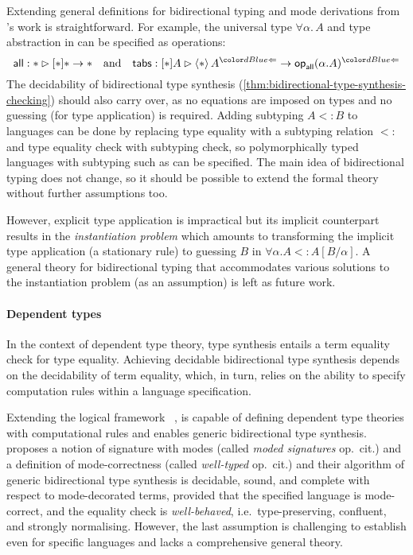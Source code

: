 Extending general definitions for bidirectional typing and mode derivations from \citeauthor{Hamana2011}'s work is straightforward. 
For example, the universal type $\forall \alpha.\, A$ and type abstraction in \SystemF can be specified as operations:
\[
\mathsf{all} : * \rhd [*] * \to *
\quad\text{and}\quad
\mathsf{tabs} : [*] A \rhd \left< * \right> A^{\chk} \to \tyOp_{\mathsf{all}}(\alpha. A)^{\chk}
\]
The decidability of bidirectional type synthesis (\cref{thm:bidirectional-type-synthesis-checking}) should also carry over, as no equations are imposed on types and no guessing (for type application) is required.
Adding subtyping $A \mathrel{<:} B$ to languages can be done by replacing type equality with a subtyping relation $\mathrel{<:}$ and type equality check with subtyping check, so polymorphically typed languages with subtyping such as \SystemFsub can be specified.
The main idea of bidirectional typing does not change, so it should be possible to extend the formal theory without further assumptions too.

However, explicit type application is impractical but its implicit counterpart results in the \emph{instantiation problem} which amounts to transforming the implicit type application (a stationary rule) to guessing $B$ in $\forall \alpha. A <: A[B/\alpha]$.
A general theory for bidirectional typing that accommodates various solutions to the instantiation problem (as an assumption) is left as future work.

\paragraph{Dependent types}
In the context of dependent type theory, type synthesis entails a term equality check for type equality.
Achieving decidable bidirectional type synthesis depends on the decidability of term equality, which, in turn, relies on the ability to specify computation rules within a language specification.

Extending the logical framework \Dedukti~\cite{Assaf2016},  is capable of defining dependent type theories with computational rules and enables generic bidirectional type synthesis.
\citeauthor{Felicissimo2023} proposes a notion of \LF signature with modes (called \emph{moded signatures} op.\ cit.) and a definition of mode-correctness (called \emph{well-typed} op.\ cit.) and their algorithm of generic bidirectional type synthesis is decidable, sound, and complete with respect to mode-decorated terms, provided that the specified language is mode-correct, and the equality check is \emph{well-behaved}, i.e.\ type-preserving, confluent, and strongly normalising.
However, the last assumption is challenging to establish even for specific languages and lacks a comprehensive general theory.

